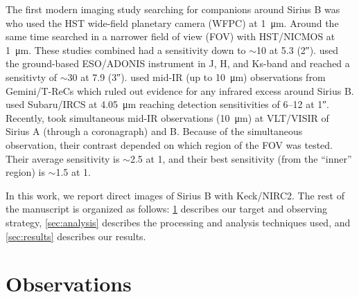 \documentclass[twocolumn,linenumbers]{aastex631}
\begin{document}
The first modern imaging study searching for companions around Sirius B was \citet{schroeder_search_2000} who used the HST wide-field planetary camera (WFPC) at \qty{1}{\micro\meter}. Around the same time \citet{kuchner_search_2000} searched in a narrower field of view (FOV) with HST/NICMOS at \qty{1}{\micro\meter}. These studies combined had a sensitivity down to $\sim$\qty{10}{\jupitermass} at \qty{5.3}{\au} (\ang{;;2}). \citet{bonnet-bidaud_adonis_2008} used the ground-based ESO/ADONIS instrument in J, H, and Ks-band and reached a sensitivty of $\sim$\qty{30}{\jupitermass} at \qty{7.9}{\au} (\ang{;;3}). \citet{skemer_sirius_2011} used mid-IR (up to \qty{10}{\micro\meter}) observations from Gemini/T-ReCs which ruled out evidence for any infrared excess around Sirius B. \citet{thalmann_piercing_2011} used Subaru/IRCS at \qty{4.05}{\micro\meter} reaching detection sensitivities of \qtyrange{6}{12}{\jupitermass} at \ang{;;1}. Recently, \citet{pathak_high_2021} took simultaneous mid-IR observations (\qty{10}{\micro\meter}) at VLT/VISIR of Sirius A (through a coronagraph) and B. Because of the simultaneous observation, their contrast depended on which region of the FOV was tested. Their average sensitivity is $\sim$\qty{2.5}{\jupitermass} at \qty{1}{\au}, and their best sensitivity (from the ``inner'' region) is $\sim$\qty{1.5}{\jupitermass} at \qty{1}{\au}.

In this work, we report direct images of Sirius B with Keck/NIRC2. The rest of the manuscript is organized as follows: \cref{sec:obs} describes our target and observing strategy, \cref{sec:analysis} describes the processing and analysis techniques used, and \cref{sec:results} describes our results.

\section{Observations} \label{sec:obs}
\end{document}
